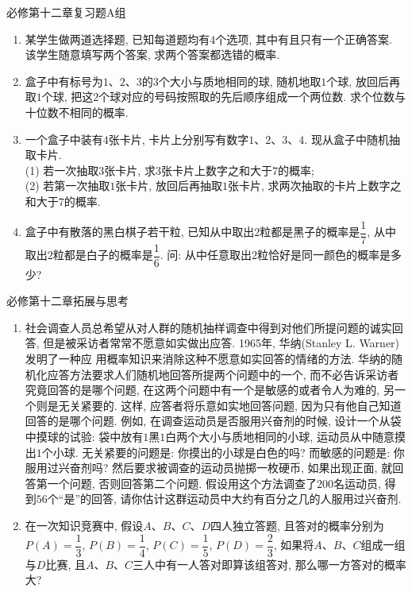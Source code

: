 \documentclass[10pt,a4paper]{article}
\begin{document}
必修第十二章复习题A组

\begin{enumerate}[1.]

\item 某学生做两道选择题, 已知每道题均有$4$个选项, 其中有且只有一个正确答案. 该学生随意填写两个答案, 求两个答案都选错的概率.
\vspace*{3cm}
\item 盒子中有标号为$1$、$2$、$3$的$3$个大小与质地相同的球, 随机地取$1$个球, 放回后再取$1$个球, 把这$2$个球对应的号码按照取的先后顺序组成一个两位数. 求个位数与十位数不相同的概率.
\vspace*{3cm}
\item 一个盒子中装有$4$张卡片, 卡片上分别写有数字$1$、$2$、$3$、$4$. 现从盒子中随机抽取卡片.\\
(1) 若一次抽取$3$张卡片, 求$3$张卡片上数字之和大于$7$的概率;\\
(2) 若第一次抽取$1$张卡片, 放回后再抽取$1$张卡片, 求两次抽取的卡片上数字之和大于$7$的概率.
\vspace*{3cm}
\item 盒子中有散落的黑白棋子若干粒, 已知从中取出$2$粒都是黑子的概率是$\dfrac 17$, 从中取出$2$粒都是白子的概率是$\dfrac 16$. 问: 从中任意取出$2$粒恰好是同一颜色的概率是多少?
\vspace*{3cm}
\end{enumerate}

必修第十二章拓展与思考

\begin{enumerate}[1.]

\item 社会调查人员总希望从对人群的随机抽样调查中得到对他们所提问题的诚实回答, 但是被采访者常常不愿意如实做出应答. 1965年, 华纳(Stanley L. Warner)发明了一种应
用概率知识来消除这种不愿意如实回答的情绪的方法. 华纳的随机化应答方法要求人们随机地回答所提两个问题中的一个, 而不必告诉采访者究竟回答的是哪个问题, 在这两个问题中有一个是敏感的或者令人为难的, 另一个则是无关紧要的. 这样, 应答者将乐意如实地回答问题, 因为只有他自己知道回答的是哪个问题. 例如, 在调查运动员是否服用兴奋剂的时候, 设计一个从袋中摸球的试验: 袋中放有$1$黑$1$白两个大小与质地相同的小球, 运动员从中随意摸出$1$个小球. 无关紧要的问题是: 你摸出的小球是白色的吗? 而敏感的问题是: 你服用过兴奋剂吗? 然后要求被调查的运动员抛掷一枚硬币, 如果出现正面, 就回答第一个问题, 否则回答第二个问题. 假设用这个方法调查了$200$名运动员, 得到$56$个``是''的回答, 请你估计这群运动员中大约有百分之几的人服用过兴奋剂.
\vspace*{3cm}
\item 在一次知识竞赛中, 假设$A$、$B$、$C$、$D$四人独立答题, 且答对的概率分别为$P(A)=\dfrac 13$, $P(B)=\dfrac 14$, $P(C)=\dfrac 15$, $P(D)=\dfrac 23$, 如果将$A$、$B$、$C$组成一组与$D$比赛, 且$A$、$B$、$C$三人中有一人答对即算该组答对, 那么哪一方答对的概率大?
\vspace*{3cm}
\end{enumerate}
\end{document}
